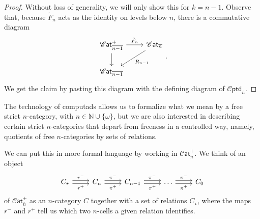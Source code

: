 \documentclass[12pt,a4paper]{article}
\numberwithin{equation}{section}
\newcommand{\cat}[1]{\mathscr{C} \mathsf{at}_{\overline{#1}}}
\newcommand{\cptd}[1]{\mathscr{C} \mathsf{ptd}_{\overline{#1}}}
\begin{document}
\begin{proof}
    Without loss of generality, we will only show this for $k=n-1$. Observe that, because $\tilde{F}_n$ acts as the identity on levels below $n$, there is a commutative diagram
    \begin{equation}
        \begin{tikzcd}
            \cat{n-1}^+ \arrow[d] \arrow[r, "\tilde{F}_n"] & \cat{n} \arrow[dl, "R_{n-1}"] \\
            \cat{n-1}
        \end{tikzcd}.
    \end{equation}
    We get the claim by pasting this diagram with the defining diagram of $\cptd{n}$.
\end{proof}

The technology of computads allows us to formalize what we mean by a free strict $n$-category, with $n \in \mathbb{N} \cup \{ \omega \}$, but we are also interested in describing certain strict $n$-categories that depart from freeness in a controlled way, namely, quotients of free $n$-categories by sets of relations.

We can put this in more formal language by working in $\cat{n}^+$. We think of an object
%
\begin{equation}\label{eq:object_of_catplus}
    \begin{tikzcd}
        C_\star \arrow[r, shift left=0.5ex, "r^-"] \arrow[r, shift right=0.5ex, "r^+"'] & C_{n} \arrow[r, shift left=0.5ex, "\pi^-"] \arrow[r, shift right=0.5ex, "\pi^+"'] & C_{n-1} \arrow[r, shift left=0.5ex, "\pi^-"] \arrow[r, shift right=0.5ex, "\pi^+"'] & \dots \arrow[r, shift left=0.5ex, "\pi^-"] \arrow[r, shift right=0.5ex, "\pi^+"'] & C_0
    \end{tikzcd}
\end{equation}
%
of $\cat{n}^+$ as an $n$-category $C$ together with a set of relations $C_\star$, where the maps $r^-$ and $r^+$ tell us which two $n$-cells a given relation identifies.
\end{document}
